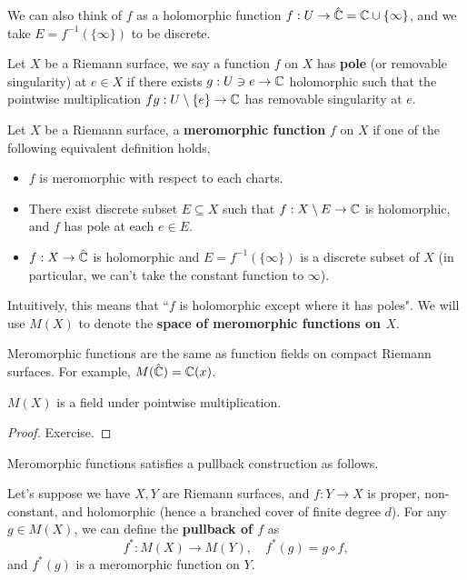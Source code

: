 \documentclass{article}
\begin{document}
{We can also think of $f$ as a holomorphic function $f: U \to \hat{\mathbb{C}} = \mathbb{C} \cup \{\infty\}$, and we take $E = f^{-1}(\{\infty\})$ to be discrete. 

\begin{definition}
    Let $X$ be a Riemann surface, we say a function $f$ on $X$ has \textbf{pole} (or removable singularity) at $e \in X$ if there exists $g: U \ni e \to \mathbb{C}$ holomorphic such that the pointwise multiplication $fg: U \setminus \{e\} \to \mathbb{C}$ has removable singularity at $e$.
\end{definition}

\begin{definition}
Let $X$ be a Riemann surface, a \textbf{meromorphic function} $f$ on $X$ if one of the following equivalent definition holds,
\begin{itemize}
    \item $f$ is meromorphic with respect to each charts.
    \item There exist discrete subset $E \subseteq X$ such that $f: X \setminus E \to \mathbb{C}$ is holomorphic, and $f$ has pole at each $e \in E$.
    \item $f: X \to \hat{\mathbb{C}}$ is holomorphic and $E = f^{-1}(\{\infty\})$ is a discrete subset of $X$ (in particular, we can't take the constant function to $\infty$). 
\end{itemize}
Intuitively, this means that ``$f$ is holomorphic except where it has poles". We will use $M(X)$ to denote the \textbf{space of meromorphic functions on $X$}.
\end{definition}

\begin{remark}
    Meromorphic functions are the same as function fields on compact Riemann surfaces. For example, $M(\hat{\mathbb{C}}) = \mathbb{C}(x)$.
\end{remark}

\begin{theorem}
    $M(X)$ is a field under pointwise multiplication.
\end{theorem}

\begin{proof}
    Exercise.
\end{proof}

Meromorphic functions satisfies a pullback construction as follows.\\

\begin{definition}
Let's suppose we have $X, Y$ are Riemann surfaces, and $f: Y \to X$ is proper, non-constant, and holomorphic (hence a branched cover of finite degree $d$). For any $g \in M(X)$, we can define the \textbf{pullback of $f$} as
\[f^*: M(X) \to M(Y),\quad f^*(g) = g \circ f,\]
and $f^*(g)$ is a meromorphic function on $Y$.    
\end{definition}

}
\end{document}
